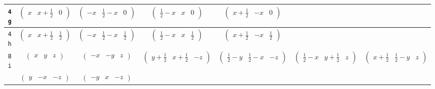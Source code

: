 \documentclass[fleqn,9pt,landscape]{jsarticle}
\begin{document}
\begin{center}
\begin{longtable}{ccccccc}
{\tt 4g} & $ \begin{pmatrix} x & x + \frac{1}{2} & 0 \end{pmatrix} $ & $ \begin{pmatrix} - x & \frac{1}{2} - x & 0 \end{pmatrix} $ & $ \begin{pmatrix} \frac{1}{2} - x & x & 0 \end{pmatrix} $ & $ \begin{pmatrix} x + \frac{1}{2} & - x & 0 \end{pmatrix} $ & $  $ & $  $ \\ \hline
{\tt 4h} & $ \begin{pmatrix} x & x + \frac{1}{2} & \frac{1}{2} \end{pmatrix} $ & $ \begin{pmatrix} - x & \frac{1}{2} - x & \frac{1}{2} \end{pmatrix} $ & $ \begin{pmatrix} \frac{1}{2} - x & x & \frac{1}{2} \end{pmatrix} $ & $ \begin{pmatrix} x + \frac{1}{2} & - x & \frac{1}{2} \end{pmatrix} $ & $  $ & $  $ \\ \hline
{\tt 8i} & $ \begin{pmatrix} x & y & z \end{pmatrix} $ & $ \begin{pmatrix} - x & - y & z \end{pmatrix} $ & $ \begin{pmatrix} y + \frac{1}{2} & x + \frac{1}{2} & - z \end{pmatrix} $ & $ \begin{pmatrix} \frac{1}{2} - y & \frac{1}{2} - x & - z \end{pmatrix} $ & $ \begin{pmatrix} \frac{1}{2} - x & y + \frac{1}{2} & z \end{pmatrix} $ & $ \begin{pmatrix} x + \frac{1}{2} & \frac{1}{2} - y & z \end{pmatrix} $ \\
& $ \begin{pmatrix} y & - x & - z \end{pmatrix} $ & $ \begin{pmatrix} - y & x & - z \end{pmatrix} $ & $  $ & $  $ & $  $ & $  $ \\
\end{longtable}
\end{center}
\end{document}
